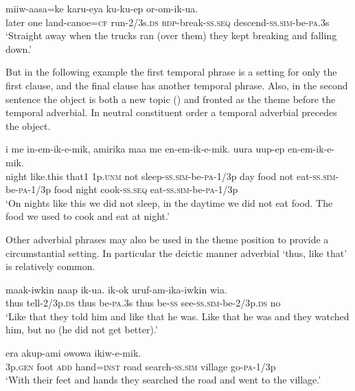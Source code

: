 \ea%
\label{ex:x1916}
\gll {}   miiw-aasa=ke  karu-eya  ku-ku-ep or-om-ik-ua.\\
later  one  land-canoe=\textsc{cf}  run-2/3s.\textsc{ds}  \textsc{rdp}-break-\textsc{ss}.\textsc{seq} descend-\textsc{ss}.\textsc{sim}-be-\textsc{pa}.3s     \\
\glt`Straight away when the trucks ran (over them) they kept breaking and falling down.'
\z


But in the following example the first temporal phrase is a setting for only the first clause, and the final clause has another temporal phrase. Also, in the second sentence the object is both a new topic () and fronted as the theme before the temporal adverbial. In neutral constituent order a temporal adverbial precedes the object. 

\ea%
\label{ex:x1703}
\gll {}    i  me  in-em-ik-e-mik, amirika  maa  me  en-em-ik-e-mik.   uura  uup-ep  en-em-ik-e-mik.\\
night  like.this  that1  1p.\textsc{unm}  not  sleep-\textsc{ss}.\textsc{sim}-be-\textsc{pa}-1/3p day  food  not  eat-\textsc{ss}.\textsc{sim}-be-\textsc{pa}-1/3p food  night  cook-\textsc{ss}.\textsc{seq}  eat-\textsc{ss}.\textsc{sim}-be-\textsc{pa}-1/3p\\
\glt`On nights like this we did not sleep, in the daytime we did not eat food. The food we used to cook and eat at night.'
\z


Other adverbial phrases may also be used in the theme position to provide a circumstantial setting. In particular the deictic manner adverbial  `thus, like that' is relatively common.

\ea%
\label{ex:x1917}
\gll {}  maak-iwkin  naap  ik-ua.    ik-ok uruf-am-ika-iwkin  wia. \\
thus  tell-2/3p.\textsc{ds}  thus  be-\textsc{pa}.3s  thus  be-\textsc{ss} see-\textsc{ss}.\textsc{sim}-be-2/3p.\textsc{ds}  no      \\
\glt`Like that they told him and like that he was. Like that he was and they watched him, but no (he did not get better).'
\z


\ea%
\label{ex:x1918}
\gll {}      era  akup-ami  owowa ikiw-e-mik.\\
3p.\textsc{gen}  foot  \textsc{add}  hand=\textsc{inst}  road  search-\textsc{ss}.\textsc{sim}  village go-\textsc{pa}-1/3p\\
\glt`With their feet and hands they searched the road and went to the village.'
\z



